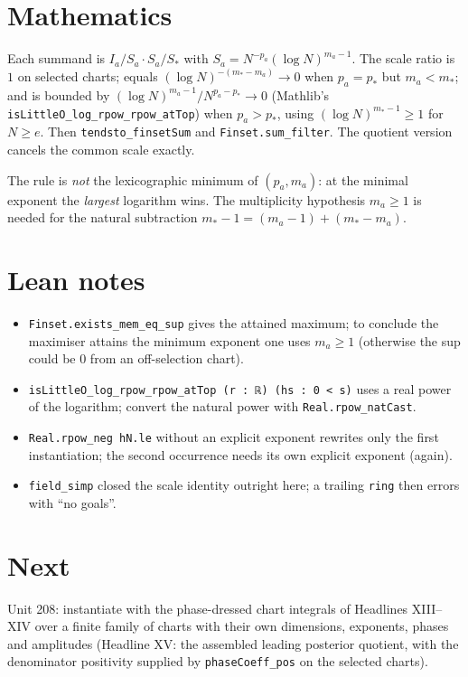 \documentclass[11pt]{article}
\begin{document}
\section{Mathematics}
Each summand is $I_a/S_a\cdot S_a/S_*$ with $S_a=N^{-p_a}(\log N)^{m_a-1}$. The scale ratio is $1$
on selected charts; equals $(\log N)^{-(m_*-m_a)}\to0$ when $p_a=p_*$ but $m_a<m_*$; and is bounded
by $(\log N)^{m_a-1}/N^{p_a-p_*}\to0$ (Mathlib's \texttt{isLittleO\_log\_rpow\_rpow\_atTop}) when
$p_a>p_*$, using $(\log N)^{m_*-1}\ge1$ for $N\ge e$. Then \texttt{tendsto\_finsetSum} and
\texttt{Finset.sum\_filter}. The quotient version cancels the common scale exactly.

The rule is \emph{not} the lexicographic minimum of $(p_a,m_a)$: at the minimal exponent the
\emph{largest} logarithm wins. The multiplicity hypothesis $m_a\ge1$ is needed for the natural
subtraction $m_*-1=(m_a-1)+(m_*-m_a)$.

\section{Lean notes}
\begin{itemize}
\item \texttt{Finset.exists\_mem\_eq\_sup} gives the attained maximum; to conclude the maximiser
  attains the minimum exponent one uses $m_a\ge1$ (otherwise the sup could be $0$ from an
  off-selection chart).
\item \texttt{isLittleO\_log\_rpow\_rpow\_atTop (r : ℝ) (hs : 0 < s)} uses a real power of the
  logarithm; convert the natural power with \texttt{Real.rpow\_natCast}.
\item \texttt{Real.rpow\_neg hN.le} without an explicit exponent rewrites only the first
  instantiation; the second occurrence needs its own explicit exponent (again).
\item \texttt{field\_simp} closed the scale identity outright here; a trailing \texttt{ring} then
  errors with ``no goals''.
\end{itemize}

\section{Next}
Unit 208: instantiate with the phase-dressed chart integrals of Headlines XIII--XIV over a finite
family of charts with their own dimensions, exponents, phases and amplitudes (Headline XV: the
assembled leading posterior quotient, with the denominator positivity supplied by
\texttt{phaseCoeff\_pos} on the selected charts).
\end{document}

